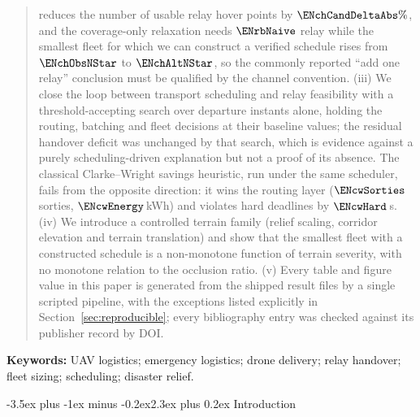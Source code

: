 \documentclass[11pt]{article}
\makeatletter
\def\section{\@startsection{section}{1}{\z@}%
    {1.0\baselineskip plus 0.25\baselineskip minus 0.25\baselineskip}%
    {0.4\baselineskip}%
    {\normalfont\normalsize\centering\bfseries}}%
\renewcommand{\section}{\@startsection{section}{1}{\z@}%
      {-3.5ex plus -1ex minus -0.2ex}{2.3ex plus 0.2ex}%
      {\normalfont\Large\bfseries}}%
\renewcommand{\section}{\@startsection{section}{1}{\z@}%
      {-3.5ex plus -1ex minus -0.2ex}{2.3ex plus 0.2ex}%
      {\normalfont\large\bfseries}}%
\theoremstyle{dshplain}
\theoremstyle{dshdefn}
\makeatother
\begin{document}
\begin{abstract}
reduces the number of usable relay hover points by $\ENchCandDeltaAbs\%$, and the
coverage-only relaxation needs $\ENrbNaive$ relay while the smallest fleet
for which we can construct a verified schedule rises from $\ENchObsNStar$ to
$\ENchAltNStar$, so the commonly reported ``add one relay''
conclusion must be qualified by the channel convention.
(iii) We close the loop between transport scheduling and relay feasibility with
a threshold-accepting search over departure instants alone, holding the routing,
batching and fleet decisions at their baseline values; the residual handover
deficit was unchanged by that search, which is evidence against a purely
scheduling-driven explanation but not a proof of its absence. The classical
Clarke--Wright savings heuristic, run under the same scheduler, fails from the
opposite direction: it wins the routing layer
($\ENcwSorties$ sorties, $\ENcwEnergy$\,kWh) and violates hard deadlines by
$\ENcwHard$\,s.
(iv) We introduce a controlled terrain family (relief scaling, corridor
elevation and terrain translation) and show that the smallest fleet with a
constructed schedule is a non-monotone function of terrain severity, with no
monotone relation to the occlusion ratio.
(v) Every table and figure value in this paper is generated from the shipped
result files by a single scripted pipeline, with the exceptions listed explicitly
in Section~\ref{sec:reproducible}; every bibliography entry was checked against
its publisher record by DOI.
\end{abstract}

\noindent\textbf{Keywords:} UAV logistics; emergency logistics; drone delivery;
relay handover; fleet sizing; scheduling; disaster relief.

\section{Introduction}
\label{sec:intro}
\end{document}
